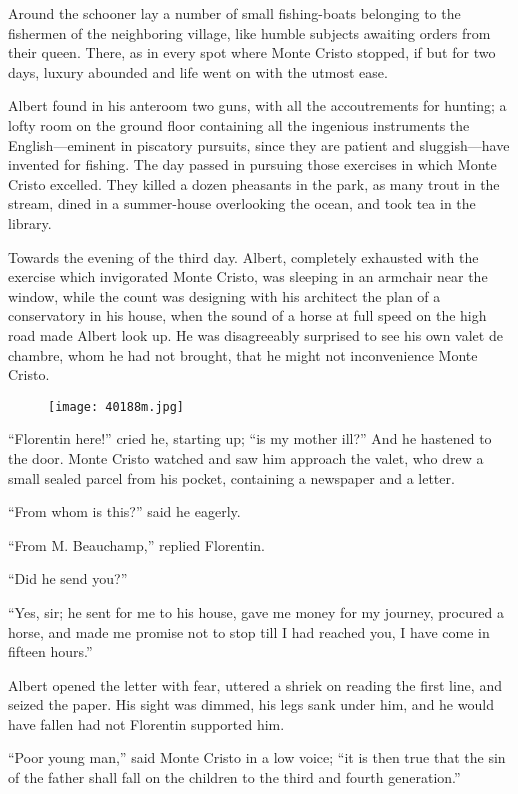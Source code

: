 Around the schooner lay a number of small fishing-boats belonging to
the fishermen of the neighboring village, like humble subjects awaiting
orders from their queen. There, as in every spot where Monte Cristo
stopped, if but for two days, luxury abounded and life went on with the
utmost ease.

Albert found in his anteroom two guns, with all the accoutrements for
hunting; a lofty room on the ground floor containing all the ingenious
instruments the English—eminent in piscatory pursuits, since they are
patient and sluggish—have invented for fishing. The day passed in
pursuing those exercises in which Monte Cristo excelled. They killed a
dozen pheasants in the park, as many trout in the stream, dined in a
summer-house overlooking the ocean, and took tea in the library.

Towards the evening of the third day. Albert, completely exhausted with
the exercise which invigorated Monte Cristo, was sleeping in an
armchair near the window, while the count was designing with his
architect the plan of a conservatory in his house, when the sound of a
horse at full speed on the high road made Albert look up. He was
disagreeably surprised to see his own valet de chambre, whom he had not
brought, that he might not inconvenience Monte Cristo.

\begin{figure}[ht]
\texttt{[image: 40188m.jpg]}
\end{figure}

“Florentin here!” cried he, starting up; “is my mother ill?” And he
hastened to the door. Monte Cristo watched and saw him approach the
valet, who drew a small sealed parcel from his pocket, containing a
newspaper and a letter.

“From whom is this?” said he eagerly.

“From M. Beauchamp,” replied Florentin.

“Did he send you?”

“Yes, sir; he sent for me to his house, gave me money for my journey,
procured a horse, and made me promise not to stop till I had reached
you, I have come in fifteen hours.”

Albert opened the letter with fear, uttered a shriek on reading the
first line, and seized the paper. His sight was dimmed, his legs sank
under him, and he would have fallen had not Florentin supported him.

“Poor young man,” said Monte Cristo in a low voice; “it is then true
that the sin of the father shall fall on the children to the third and
fourth generation.”

